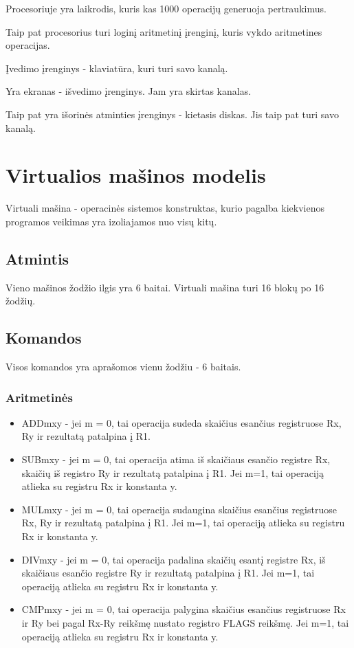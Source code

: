 \documentclass{VUMIFInfKursinis}
\begin{document}
Procesoriuje yra laikrodis, kuris kas 1000 operacijų generuoja pertraukimus.

Taip pat procesorius turi loginį aritmetinį įrenginį, kuris vykdo aritmetines operacijas.

Įvedimo įrenginys - klaviatūra, kuri turi savo kanalą.

Yra ekranas - išvedimo įrenginys. Jam yra skirtas kanalas.

Taip pat yra išorinės atminties įrenginys - kietasis diskas. Jis taip pat turi savo kanalą.

\section{Virtualios mašinos modelis}

Virtuali mašina - operacinės sistemos konstruktas, kurio pagalba kiekvienos programos veikimas yra izoliajamos nuo visų kitų.

\subsection{Atmintis}

Vieno mašinos žodžio ilgis yra 6 baitai. Virtuali mašina turi 16 blokų po 16 žodžių.

\subsection{Komandos}

Visos komandos yra aprašomos vienu žodžiu - 6 baitais.

\subsubsection{Aritmetinės}
\begin{itemize}
	
	\item ADDmxy - jei m = 0, tai operacija sudeda skaičius esančius registruose Rx, Ry ir rezultatą patalpina į R1.
	\item SUBmxy - jei m = 0, tai operacija atima iš skaičiaus esančio registre Rx, skaičių iš registro Ry ir rezultatą patalpina į R1. Jei m=1, tai operaciją atlieka su registru Rx ir konstanta y.
	\item MULmxy - jei m = 0, tai operacija sudaugina skaičius esančius registruose Rx, Ry ir rezultatą patalpina į R1. Jei m=1, tai operaciją atlieka su registru Rx ir konstanta y.
	\item DIVmxy - jei m = 0, tai operacija padalina skaičių esantį registre Rx, iš skaičiaus esančio registre Ry ir rezultatą patalpina į R1. Jei m=1, tai operaciją atlieka su registru Rx ir konstanta y.
	\item CMPmxy - jei m = 0, tai operacija palygina skaičius esančius registruose Rx ir Ry bei pagal Rx-Ry reikšmę nustato registro FLAGS reikšmę. Jei m=1, tai operaciją atlieka su registru Rx ir konstanta y.
\end{itemize}
\end{document}
